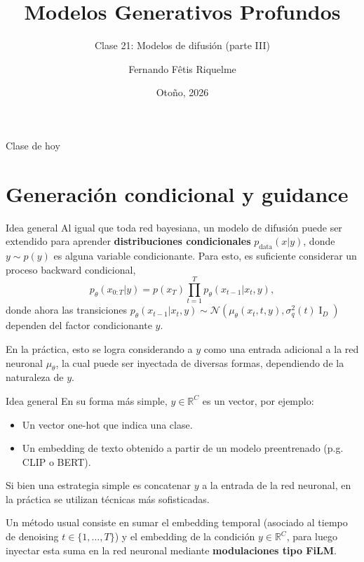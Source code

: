 \documentclass{beamer}
\title{Modelos Generativos Profundos}
\subtitle{Clase 21: Modelos de difusión (parte III)}
\author{Fernando Fêtis Riquelme}
\institute{
    Facultad de Ciencias Físicas y Matemáticas\\
    Universidad de Chile
}
\date{Otoño, 2026}
\newcommand{\R}{\mathbb{R}}
\begin{document}
\begin{frame}
    \titlepage
\end{frame}

\begin{frame}{Clase de hoy}
    \tableofcontents
\end{frame}

\section{Generación condicional y guidance}

\begin{frame}{Idea general}
    Al igual que toda red bayesiana, un modelo de difusión puede ser extendido para aprender \textbf{distribuciones condicionales} $p_\text{data}(x|y)$, donde $y\sim p(y)$ es alguna variable condicionante. Para esto, es suficiente considerar un proceso backward condicional,
    \begin{equation*}
        p_\theta(x_{0:T}|y)=p(x_T)\prod_{t=1}^T p_\theta(x_{t-1}|x_t,y),
    \end{equation*}
    donde ahora las transiciones $p_\theta(x_{t-1}|x_t, y)\sim\mathcal{N}\left(\mu_\theta(x_t,t, y),\sigma_q^2(t)\operatorname{I}_D\right)$ dependen del factor condicionante $y$.

    En la práctica, esto se logra considerando a $y$ como una entrada adicional a la red neuronal $\mu_\theta$, la cual puede ser inyectada de diversas formas, dependiendo de la naturaleza de $y$.
\end{frame}

\begin{frame}{Idea general}
    En su forma más simple, $y\in\R^C$ es un vector, por ejemplo:
    \begin{itemize}
        \item Un vector one-hot que indica una clase.
        \item Un embedding de texto obtenido a partir de un modelo preentrenado (p.g. CLIP o BERT).
    \end{itemize}
    Si bien una estrategia simple es concatenar $y$ a la entrada de la red neuronal, en la práctica se utilizan técnicas más sofisticadas.

    Un método usual consiste en sumar el embedding temporal (asociado al tiempo de denoising $t\in\{1,\ldots,T\}$) y el embedding de la condición $y\in\R^C$, para luego inyectar esta suma en la red neuronal mediante \textbf{modulaciones tipo FiLM}.
\end{frame}
\end{document}
